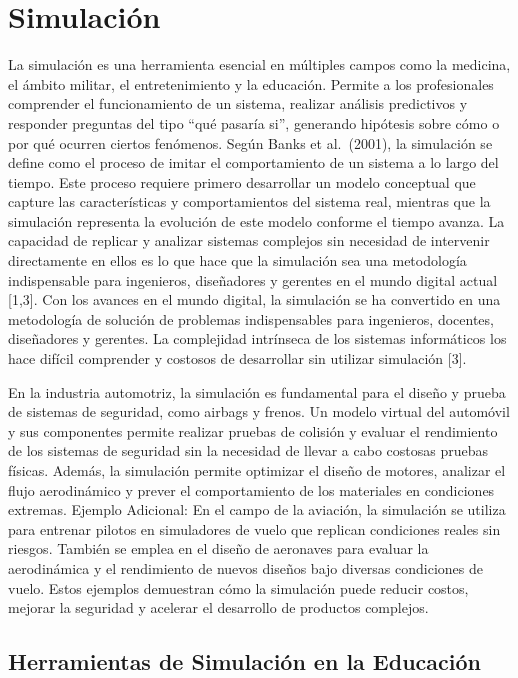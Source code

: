 \documentclass[12pt,twoside]{templates/unerthesis}
\begin{document}
\hypertarget{simulaciuxf3n}{%
\section{Simulación}\label{simulaciuxf3n}}

La simulación es una herramienta esencial en múltiples campos como la medicina, el ámbito militar, el entretenimiento y la educación. Permite a los profesionales comprender el funcionamiento de un sistema, realizar análisis predictivos y responder preguntas del tipo ``qué pasaría si'', generando hipótesis sobre cómo o por qué ocurren ciertos fenómenos. Según Banks et al.~(2001), la simulación se define como el proceso de imitar el comportamiento de un sistema a lo largo del tiempo. Este proceso requiere primero desarrollar un modelo conceptual que capture las características y comportamientos del sistema real, mientras que la simulación representa la evolución de este modelo conforme el tiempo avanza. La capacidad de replicar y analizar sistemas complejos sin necesidad de intervenir directamente en ellos es lo que hace que la simulación sea una metodología indispensable para ingenieros, diseñadores y gerentes en el mundo digital actual {[}1,3{]}.
Con los avances en el mundo digital, la simulación se ha convertido en una metodología de solución de problemas indispensables para ingenieros, docentes, diseñadores y gerentes. La complejidad intrínseca de los sistemas informáticos los hace difícil comprender y costosos de desarrollar sin utilizar simulación {[}3{]}.

En la industria automotriz, la simulación es fundamental para el diseño y prueba de sistemas de seguridad, como airbags y frenos. Un modelo virtual del automóvil y sus componentes permite realizar pruebas de colisión y evaluar el rendimiento de los sistemas de seguridad sin la necesidad de llevar a cabo costosas pruebas físicas. Además, la simulación permite optimizar el diseño de motores, analizar el flujo aerodinámico y prever el comportamiento de los materiales en condiciones extremas.
Ejemplo Adicional:
En el campo de la aviación, la simulación se utiliza para entrenar pilotos en simuladores de vuelo que replican condiciones reales sin riesgos. También se emplea en el diseño de aeronaves para evaluar la aerodinámica y el rendimiento de nuevos diseños bajo diversas condiciones de vuelo. Estos ejemplos demuestran cómo la simulación puede reducir costos, mejorar la seguridad y acelerar el desarrollo de productos complejos.

\hypertarget{herramientas-de-simulaciuxf3n-en-la-educaciuxf3n}{%
\subsection{Herramientas de Simulación en la Educación}\label{herramientas-de-simulaciuxf3n-en-la-educaciuxf3n}}
\end{document}
